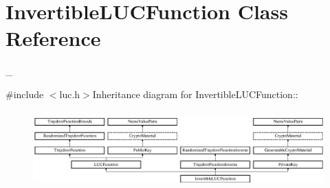 \hypertarget{class_invertible_l_u_c_function}{
\section{InvertibleLUCFunction Class Reference}
\label{class_invertible_l_u_c_function}
}


\_\-  


{\ttfamily \#include $<$luc.h$>$}Inheritance diagram for InvertibleLUCFunction::\begin{figure}[H]
\begin{center}
\leavevmode
\includegraphics[height=3.0303cm]{class_invertible_l_u_c_function}
\end{center}
\end{figure}
